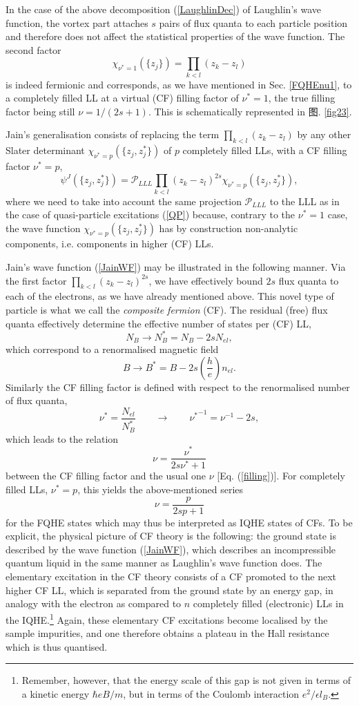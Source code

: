 \documentclass[10pt]{book}
\newcommand{\red}{\color{red}}
\newcommand{\Pmath}{\mathcal{P}}
\newcommand{\beq}{\begin{equation}}
\newcommand{\eeq}{\end{equation}}
\begin{document}
In the case of the above decomposition (\ref{LaughlinDec}) of Laughlin's wave function,
the vortex part attaches $s$ pairs of flux quanta
to each particle position and therefore does not affect the statistical properties of the wave function. 
The second factor 
$$\chi_{\nu^*=1}(\{z_j\})=\prod_{k<l}(z_k - z_l)$$ 
is indeed fermionic and
corresponds, as we have mentioned in Sec. \ref{FQHEnu1}, to a completely filled
LL at a virtual (CF) filling factor of $\nu^*=1$, the true filling factor being still $\nu=1/(2s+1)$. This is schematically
represented in 图. \ref{fig23}.

Jain's generalisation consists of replacing the term $\prod_{k<l}(z_k - z_l)$ by any other Slater determinant 
$\chi_{\nu^*=p}(\{z_j, z_j^*\})$
of $p$ completely 
filled LLs, with a CF filling factor $\nu^*=p$,
\beq\label{JainWF}
\psi^J(\{z_j,z_j^*\})=\mathcal{P}_{LLL}\prod_{k<l}\left(z_k-z_l
\right)^{2s}\chi_{\nu^*=p}(\{z_j,z_j^*\}),
\eeq
where we need to take into account the same projection $\Pmath_{LLL}$ to the LLL as in the case of quasi-particle excitations
(\ref{QP}) because, contrary to the $\nu^*=1$ case, the wave function $\chi_{\nu^*=p}(\{z_j,z_j^*\})$ has 
by construction non-analytic components, i.e. components in higher (CF) LLs. 

Jain's wave function (\ref{JainWF}) may be illustrated in the following manner. Via the first factor $\prod_{k<l}(z_k - z_l)^{2s}$,
we have effectively bound $2s$ flux quanta to each of the electrons, as we 
have already mentioned above. This novel type of particle is what we call the {\sl composite
fermion} (CF).
The residual (free) flux quanta effectively determine
the effective number of states per (CF) LL,
$$N_B\to N_B^*= N_B - 2sN_{el},$$
which correspond to a renormalised magnetic field 
\beq\label{Bstar}
B\to B^*= B - 2s\left(\frac{h}{e}\right)n_{el}.\eeq
Similarly the CF filling factor is defined with respect to the renormalised number of flux quanta,
\beq\label{CFFF}
\nu^*=\frac{N_{el}}{N_B^*}\qquad \to \qquad {\nu^*}^{-1}=\nu^{-1} - 2s,
\eeq
which leads to the relation
\beq\label{nu-nu}
\nu=\frac{\nu^*}{2s\nu^*+1}
\eeq
between the CF filling factor and the usual one $\nu$ [Eq. (\ref{filling})]. For completely filled LLs, $\nu^*=p$,
this yields the above-mentioned series 
\beq\label{JainSer}
\nu=\frac{p}{2sp+1}
\eeq
for the FQHE states which may thus be interpreted as IQHE states of CFs. 
To be explicit, the physical picture of CF theory is
the following: the ground state is described by the wave function (\ref{JainWF}), which describes an incompressible quantum 
liquid in the same manner as Laughlin's wave function does. The elementary excitation in the CF theory consists of a CF promoted
to the next higher CF LL, which is separated from the ground state by an energy gap, in analogy with the electron as compared to 
$n$ completely filled (electronic) LLs in the IQHE.\footnote{Remember, however, that the energy scale of this gap is not given
in terms of a kinetic energy $\hbar eB/m$, but in terms of the Coulomb interaction $e^2/\epsilon l_B$.} 
Again, these elementary CF excitations become localised by the sample 
impurities, and one therefore obtains a plateau in the Hall resistance which is thus quantised. 
\end{document}
